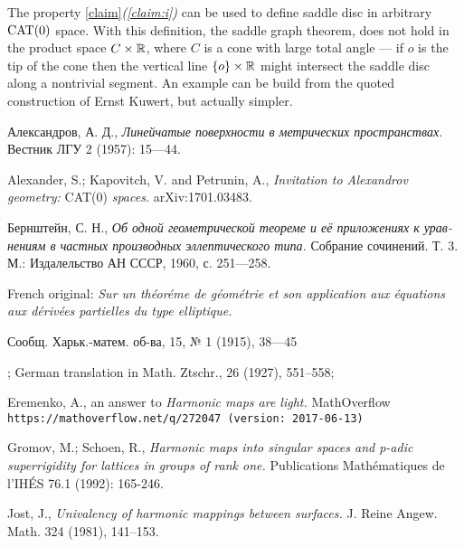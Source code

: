 \documentclass{article}
\begin{document}
The property \ref{claim}\textit{(\ref{claim:i})} can be used to define saddle disc in arbitrary $\mathop{\rm CAT}\nolimits(0)$ space.
With this definition, the saddle graph theorem, does not hold in the product space $C\times \mathbb{R}$, where $C$ is a cone with large total angle --- if $o$ is the tip of the cone then the vertical line $\{o\}\times\mathbb{R}$ might intersect the saddle disc along a nontrivial segment.
An example can be build from the quoted construction of Ernst Kuwert, but actually simpler.


\begin{thebibliography}{52}

 \begin{otherlanguage}{russian}
Александров, А. Д., 
\textit{Линейчатые поверхности в метрических пространствах.}
Вестник ЛГУ 2 (1957): 15---44.
\end{otherlanguage}

Alexander, S.; Kapovitch, V. and Petrunin, A.,
\textit{Invitation to Alexandrov geometry:} CAT(0) \textit{spaces.}
arXiv:1701.03483.

\begin{otherlanguage}{russian}
Бернштейн, С. Н., \textit{Об одной геометрической теореме и её приложениях к
уравнениям в частных производных эллептического типа.} 
Собрание сочинений. Т. 3. М.: Издалельство АН СССР, 1960, с. 251---258.
\end{otherlanguage}
French original: \textit{Sur un th\'{e}or\'{e}me de g\'{e}om\'{e}trie et son application aux \'{e}quations aux d\'{e}riv\'{e}es partielles du type elliptique.}
\begin{otherlanguage}{russian}
Сообщ. Харьк.-матем. об-ва, 15, № 1 (1915), 38---45\end{otherlanguage};
German translation in Math. Ztschr., 26 (1927), 551--558;


 Eremenko, A., 
an answer to \textit{Harmonic maps are light.} MathOverflow
\texttt{https://mathoverflow.net/q/272047 (version: 2017-06-13)}

 Gromov, M.; Schoen, R., 
\textit{Harmonic maps into singular spaces and p-adic superrigidity for lattices in groups of rank one.} 
Publications Mathématiques de l'IHÉS 76.1 (1992): 165-246.

 Jost, J.,
\textit{Univalency of harmonic mappings between surfaces.}
J. Reine Angew. Math. 324 (1981), 141--153.


\end{thebibliography}
\end{document}

